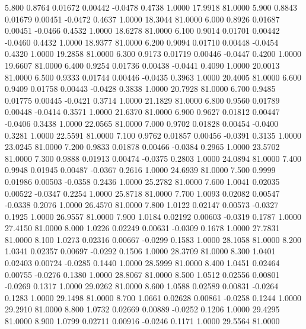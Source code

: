    5.800   0.8764   0.01672   0.00442  -0.0478   0.4738   1.0000  17.9918  81.0000
   5.900   0.8843   0.01679   0.00451  -0.0472   0.4637   1.0000  18.3044  81.0000
   6.000   0.8926   0.01687   0.00451  -0.0466   0.4532   1.0000  18.6278  81.0000
   6.100   0.9014   0.01701   0.00442  -0.0460   0.4432   1.0000  18.9377  81.0000
   6.200   0.9094   0.01710   0.00448  -0.0454   0.4320   1.0000  19.2858  81.0000
   6.300   0.9173   0.01719   0.00446  -0.0447   0.4200   1.0000  19.6607  81.0000
   6.400   0.9254   0.01736   0.00438  -0.0441   0.4090   1.0000  20.0013  81.0000
   6.500   0.9333   0.01744   0.00446  -0.0435   0.3963   1.0000  20.4005  81.0000
   6.600   0.9409   0.01758   0.00443  -0.0428   0.3838   1.0000  20.7928  81.0000
   6.700   0.9485   0.01775   0.00445  -0.0421   0.3714   1.0000  21.1829  81.0000
   6.800   0.9560   0.01789   0.00448  -0.0414   0.3571   1.0000  21.6370  81.0000
   6.900   0.9627   0.01812   0.00447  -0.0406   0.3438   1.0000  22.0565  81.0000
   7.000   0.9702   0.01828   0.00454  -0.0400   0.3281   1.0000  22.5591  81.0000
   7.100   0.9762   0.01857   0.00456  -0.0391   0.3135   1.0000  23.0245  81.0000
   7.200   0.9833   0.01878   0.00466  -0.0384   0.2965   1.0000  23.5702  81.0000
   7.300   0.9888   0.01913   0.00474  -0.0375   0.2803   1.0000  24.0894  81.0000
   7.400   0.9948   0.01945   0.00487  -0.0367   0.2616   1.0000  24.6939  81.0000
   7.500   0.9999   0.01986   0.00503  -0.0358   0.2436   1.0000  25.2782  81.0000
   7.600   1.0041   0.02035   0.00522  -0.0347   0.2254   1.0000  25.8718  81.0000
   7.700   1.0093   0.02082   0.00547  -0.0338   0.2076   1.0000  26.4570  81.0000
   7.800   1.0122   0.02147   0.00573  -0.0327   0.1925   1.0000  26.9557  81.0000
   7.900   1.0184   0.02192   0.00603  -0.0319   0.1787   1.0000  27.4150  81.0000
   8.000   1.0226   0.02249   0.00631  -0.0309   0.1678   1.0000  27.7831  81.0000
   8.100   1.0273   0.02316   0.00667  -0.0299   0.1583   1.0000  28.1058  81.0000
   8.200   1.0341   0.02357   0.00697  -0.0292   0.1506   1.0000  28.3709  81.0000
   8.300   1.0401   0.02403   0.00724  -0.0285   0.1440   1.0000  28.5999  81.0000
   8.400   1.0451   0.02464   0.00755  -0.0276   0.1380   1.0000  28.8067  81.0000
   8.500   1.0512   0.02556   0.00801  -0.0269   0.1317   1.0000  29.0262  81.0000
   8.600   1.0588   0.02589   0.00831  -0.0264   0.1283   1.0000  29.1498  81.0000
   8.700   1.0661   0.02628   0.00861  -0.0258   0.1244   1.0000  29.2910  81.0000
   8.800   1.0732   0.02669   0.00889  -0.0252   0.1206   1.0000  29.4295  81.0000
   8.900   1.0799   0.02711   0.00916  -0.0246   0.1171   1.0000  29.5564  81.0000
